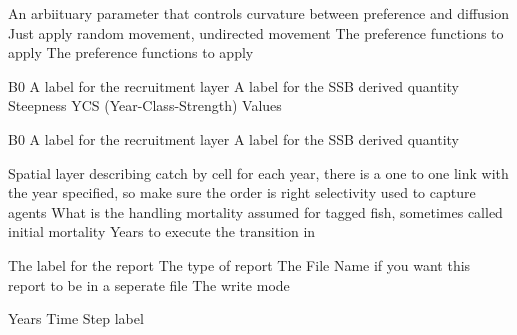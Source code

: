  {An arbiituary parameter that controls curvature between preference and diffusion}
 {Just apply random movement, undirected movement}
 {The preference functions to apply}
 {The preference functions to apply}
\par\textbf{}\par
\par\textbf{}\par
{} {B0}
 {A label for the recruitment layer}
 {A label for the SSB derived quantity}
 {Steepness}
 {YCS (Year-Class-Strength) Values}
\par\textbf{}\par
{} {B0}
 {A label for the recruitment layer}
 {A label for the SSB derived quantity}
\par\textbf{}\par
{} {Spatial layer describing catch by cell for each year, there is a one to one link with the year specified, so make sure the order is right}
 {selectivity used to capture agents}
 {What is the handling mortality assumed for tagged fish, sometimes called initial mortality}
 {Years to execute the transition in}
\par\par
{} {The label for the report}
 {The type of report}
 {The File Name if you want this report to be in a seperate file}
 {The write mode}
\par\textbf{}\par
{} {Years}
 {Time Step label}
\par\textbf{}\par
\par\textbf{}\par
\par\textbf{}\par
